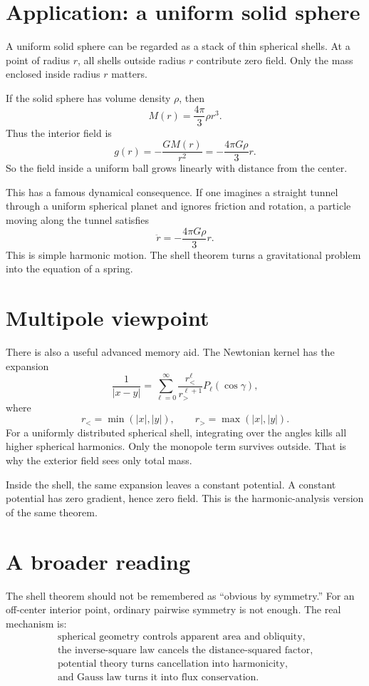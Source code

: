 \section{Application: a uniform solid sphere}

A uniform solid sphere can be regarded as a stack of thin spherical shells.  At a point of radius \(r\), all shells outside radius \(r\) contribute zero field.  Only the mass enclosed inside radius \(r\) matters.

If the solid sphere has volume density \(\rho\), then
\[
  M(r)=\frac{4\pi}{3}\rho r^3.
\]
Thus the interior field is
\[
  g(r)=-\frac{GM(r)}{r^2}
  =-\frac{4\pi G\rho}{3}r.
\]
So the field inside a uniform ball grows linearly with distance from the center.

This has a famous dynamical consequence.  If one imagines a straight tunnel through a uniform spherical planet and ignores friction and rotation, a particle moving along the tunnel satisfies
\[
  \ddot r=-\frac{4\pi G\rho}{3}r.
\]
This is simple harmonic motion.  The shell theorem turns a gravitational problem into the equation of a spring.

\section{Multipole viewpoint}

There is also a useful advanced memory aid.  The Newtonian kernel has the expansion
\[
  \frac1{|x-y|}
  =\sum_{\ell=0}^{\infty}
  \frac{r_<^\ell}{r_>^{\ell+1}}P_\ell(\cos\gamma),
\]
where
\[
  r_<=\min(|x|,|y|),\qquad r_>=\max(|x|,|y|).
\]
For a uniformly distributed spherical shell, integrating over the angles kills all higher spherical harmonics.  Only the monopole term survives outside.  That is why the exterior field sees only total mass.

Inside the shell, the same expansion leaves a constant potential.  A constant potential has zero gradient, hence zero field.  This is the harmonic-analysis version of the same theorem.

\section{A broader reading}

The shell theorem should not be remembered as ``obvious by symmetry.''  For an off-center interior point, ordinary pairwise symmetry is not enough.  The real mechanism is:
\[
\begin{array}{c}
  \text{spherical geometry controls apparent area and obliquity,}\\
  \text{the inverse-square law cancels the distance-squared factor,}\\
  \text{potential theory turns cancellation into harmonicity,}\\
  \text{and Gauss law turns it into flux conservation.}
\end{array}
\]

